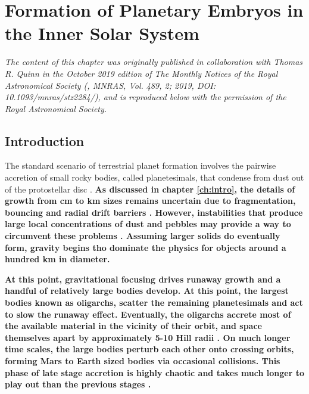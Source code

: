 \chapter {Formation of Planetary Embryos in the Inner Solar System}\label{ch:plSS}

\noindent \textit{The content of this chapter was originally published in collaboration with Thomas R. Quinn in the October 2019 edition of The Monthly Notices of the Royal Astronomical Society (\cite{wallace19}, MNRAS, Vol. 489, 2; 2019, DOI: 10.1093/mnras/stz2284/), and is reproduced below with the permission of the Royal Astronomical Society.}

\section{Introduction} \label{sec:intro}

The standard scenario of terrestrial planet formation involves the pairwise accretion of small rocky bodies, called planetesimals, 
that condense from dust out of the protostellar disc \cite{safronov69}. \textbf{As discussed in chapter \ref{ch:intro}, the details of growth from cm to km sizes remains uncertain due to fragmentation, bouncing and radial drift barriers \cite{windmark12, weidenschilling77}. However, instabilities that produce large local concentrations of dust and pebbles may provide a way to circumvent these problems \cite{urpin98, youdin05, squire18, squire20}. Assuming larger solids do eventually form, gravity begins tho dominate the physics for objects around a hundred km in diameter.}

\textbf{At this point, gravitational focusing \cite{safronov69} drives runaway growth \cite{duncan89, kokubo96, barnes09} and a handful of relatively large bodies develop. At this point, the largest bodies known as oligarchs, scatter the remaining planetesimals and act to slow the runaway effect. Eventually, the oligarchs accrete most of the available material in the vicinity of their orbit, and space themselves apart by approximately 5-10 Hill radii \cite{kokubo98, kokubo02}. On much longer time scales, the large bodies perturb each other onto crossing orbits, forming Mars to Earth sized bodies via occasional collisions. This phase of late stage accretion is highly chaotic and takes much longer to play out than the previous stages \cite{chambers98, raymond06}.}


